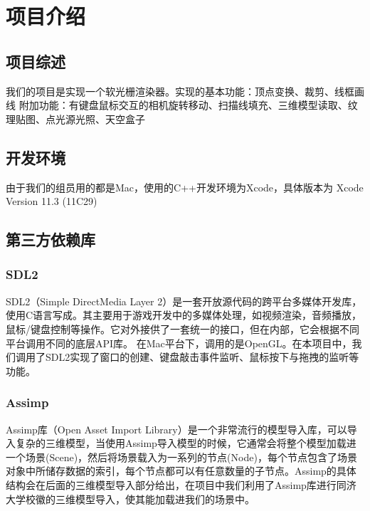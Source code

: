 

    \chapter{项目介绍}

    \section{项目综述}
        \begin{spacing}{2.5}
我们的项目是实现一个软光栅渲染器。实现的基本功能：顶点变换、裁剪、线框画线
	附加功能：有键盘鼠标交互的相机旋转移动、扫描线填充、三维模型读取、纹理贴图、点光源光照、天空盒子     	
        \end{spacing}



    \section{开发环境}
	        \begin{spacing}{2.5}
由于我们的组员用的都是Mac，使用的C++开发环境为Xcode，具体版本为 Xcode Version 11.3 (11C29)
	        \end{spacing}



    \section{第三方依赖库}


    \subsection{SDL2}
\begin{spacing}{2.5}
   SDL2（Simple DirectMedia Layer 2）是一套开放源代码的跨平台多媒体开发库，使用C语言写成。其主要用于游戏开发中的多媒体处理，如视频渲染，音频播放，鼠标/键盘控制等操作。它对外接供了一套统一的接口，但在内部，它会根据不同平台调用不同的底层API库。
   在Mac平台下，调用的是OpenGL。在本项目中，我们调用了SDL2实现了窗口的创建、键盘敲击事件监听、鼠标按下与拖拽的监听等功能。
\end{spacing}



    \subsection{Assimp}
        \begin{spacing}{2.5}
        	Assimp库（Open Asset Import Library）是一个非常流行的模型导入库，可以导入复杂的三维模型，当使用Assimp导入模型的时候，它通常会将整个模型加载进一个场景(Scene)，然后将场景载入为一系列的节点(Node)，每个节点包含了场景对象中所储存数据的索引，每个节点都可以有任意数量的子节点。Assimp的具体结构会在后面的三维模型导入部分给出，在项目中我们利用了Assimp库进行同济大学校徽的三维模型导入，使其能加载进我们的场景中。
        \end{spacing}

